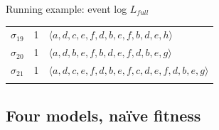 \begin{examplebox}{Running example: event log $L_{full}$}
\begin{center}
\begin{tabular}{rrl}
$\sigma_{19}$ & 1 & $\langle a,d,c,e,f,d,b,e,f,b,d,e,h\rangle$ \\
$\sigma_{20}$ & 1 & $\langle a,d,b,e,f,b,d,e,f,d,b,e,g\rangle$ \\
$\sigma_{21}$ & 1 & $\langle a,d,c,e,f,d,b,e,f,c,d,e,f,d,b,e,g\rangle$ \\
& & \\
\bottomrule
\end{tabular}
\end{center}
\end{examplebox}

\subsection{Four models, naïve fitness}

